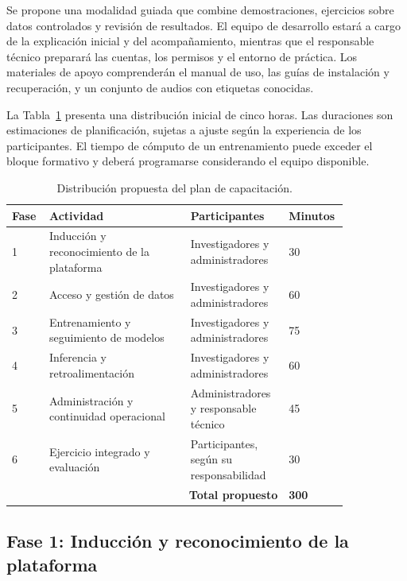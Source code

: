 Se propone una modalidad guiada que combine demostraciones, ejercicios sobre
datos controlados y revisión de resultados. El equipo de desarrollo estará a
cargo de la explicación inicial y del acompañamiento, mientras que el
responsable técnico preparará las cuentas, los permisos y el entorno de
práctica. Los materiales de apoyo comprenderán el manual de uso, las guías de
instalación y recuperación, y un conjunto de audios con etiquetas conocidas.

La Tabla~\ref{tab:plan-capacitacion} presenta una distribución inicial de cinco
horas. Las duraciones son estimaciones de planificación, sujetas a ajuste según
la experiencia de los participantes. El tiempo de cómputo de un entrenamiento
puede exceder el bloque formativo y deberá programarse considerando el equipo
disponible.

\begin{table}[htbp]
    \centering
    \caption{Distribución propuesta del plan de capacitación.}
    \label{tab:plan-capacitacion}
    \begingroup
    \small
    \renewcommand{\arraystretch}{1.18}
    \begin{tabular}{p{0.08\linewidth} p{0.39\linewidth} p{0.27\linewidth} p{0.10\linewidth}}
        \hline
        \textbf{Fase} & \textbf{Actividad} & \textbf{Participantes} & \textbf{Minutos} \\
        \hline
        1 & Inducción y reconocimiento de la plataforma & Investigadores y administradores & 30 \\
        2 & Acceso y gestión de datos & Investigadores y administradores & 60 \\
        3 & Entrenamiento y seguimiento de modelos & Investigadores y administradores & 75 \\
        4 & Inferencia y retroalimentación & Investigadores y administradores & 60 \\
        5 & Administración y continuidad operacional & Administradores y responsable técnico & 45 \\
        6 & Ejercicio integrado y evaluación & Participantes, según su responsabilidad & 30 \\
        \hline
        \multicolumn{3}{r}{\textbf{Total propuesto}} & \textbf{300} \\
        \hline
    \end{tabular}
    \endgroup
\end{table}

\subsection{Fase 1: Inducción y reconocimiento de la plataforma}


